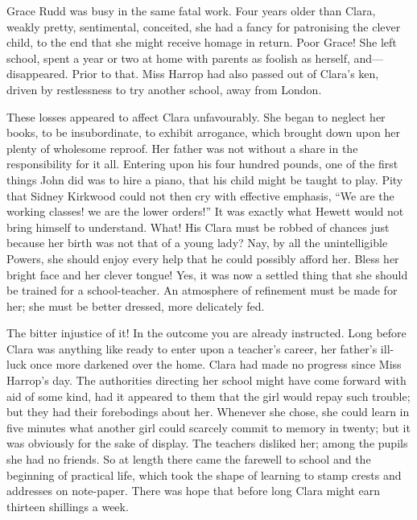 Grace Rudd was busy in the same fatal work. Four years older than Clara,
weakly pretty, sentimental, conceited, she had a fancy for patronising
the clever child, to the end that she might receive homage in return.
Poor Grace! She left school, spent a year or two at home with parents as
foolish as herself, and---disappeared. Prior to that. Miss Harrop had
also passed out of Clara's ken, driven by restlessness to try another
school, away from London.

These losses appeared to affect Clara unfavourably. She began to neglect
her books, to be insubordinate, to exhibit arrogance, which brought down
upon her plenty of {}wholesome reproof. Her father was not without a
share in the responsibility for it all. Entering upon his four hundred
pounds, one of the first things John did was to hire a piano, that his
child might be taught to play. Pity that Sidney Kirkwood could not then
cry with effective emphasis, ``We are the working classes! we are the
lower orders!'' It was exactly what Hewett would not bring himself to
understand. What! His Clara must be robbed of chances just because her
birth was not that of a young lady? Nay, by all the unintelligible
Powers, she should enjoy every help that he could possibly afford her.
Bless her bright face and her clever tongue! Yes, it was now a settled
thing that she should be trained for a school-teacher. An atmosphere of
refinement must be made for her; she must be better dressed, more
delicately fed.

The bitter injustice of it! In the outcome you are already instructed.
Long before Clara was anything like ready to enter upon a teacher's
career, her father's ill-luck once {}more darkened over the home. Clara
had made no progress since Miss Harrop's day. The authorities directing
her school might have come forward with aid of some kind, had it
appeared to them that the girl would repay such trouble; but they had
their forebodings about her. Whenever she chose, she could learn in five
minutes what another girl could scarcely commit to memory in twenty; but
it was obviously for the sake of display. The teachers disliked her;
among the pupils she had no friends. So at length there came the
farewell to school and the beginning of practical life, which took the
shape of learning to stamp crests and addresses on note-paper. There was
hope that before long Clara might earn thirteen shillings a week.

